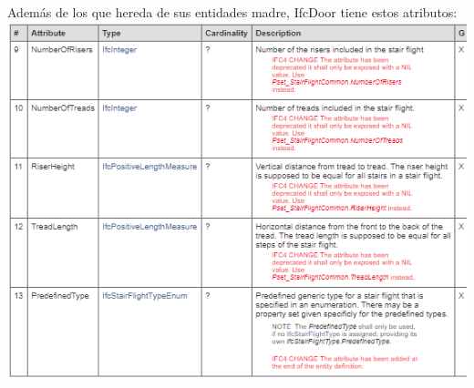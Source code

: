 \documentclass[spanish,12pt,a4paper,final,oneside]{book}
\begin{document}
Además de los que hereda de sus entidades madre, IfcDoor tiene estos atributos:
\\ \includegraphics[width=\textwidth]{atributos de IfcStairFlight}
\end{document}

